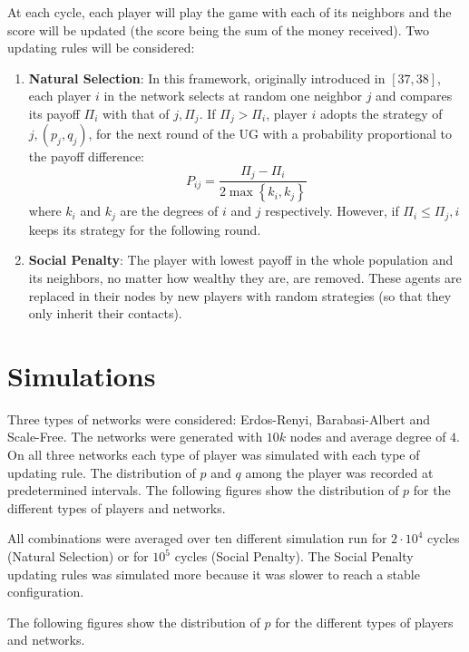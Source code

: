 At each cycle, each player will play the game with each of its neighbors and the score will be updated (the score being the sum of the money received).
Two updating rules will be considered:
\begin{enumerate}
    \item \textbf{Natural Selection}: In this framework, originally introduced in $[37,38]$, each player $i$ in the network selects at random one neighbor $j$ and compares its payoff $\Pi_i$ with that of $j, \Pi_j$. If $\Pi_j>\Pi_i$, player $i$ adopts the strategy of $j,\left(p_j, q_j\right)$, for the next round of the UG with a probability proportional to the payoff difference: 
    $$ P_{i j}=\frac{\Pi_j-\Pi_i}{2 \max \left\{k_i, k_j\right\}} $$
    where $k_i$ and $k_j$ are the degrees of $i$ and $j$ respectively. However, if $\Pi_i \leq \Pi_j, i$ keeps its strategy for the following round.

    \item \textbf{Social Penalty}: The player with lowest payoﬀ in the whole population and its neighbors, no matter how wealthy they are, are removed. These agents are replaced in their nodes by new players with random strategies (so that they only inherit their contacts).
\end{enumerate}


\section{Simulations}
Three types of networks were considered: Erdos-Renyi, Barabasi-Albert and Scale-Free. The networks were generated with $10k$ nodes and average degree of $4$. On all three networks each type of player was simulated with each type of updating rule. The distribution of $p$ and $q$ among the player was recorded at predetermined intervals. The following figures show the distribution of $p$ for the different types of players and networks.

All combinations were averaged over ten different simulation run for $2\cdot 10^4$ cycles (Natural Selection) or for $10^5$ cycles (Social Penalty). The Social Penalty updating rules was simulated more because it was slower to reach a stable configuration. 

The following figures show the distribution of $p$ for the different types of players and networks.

